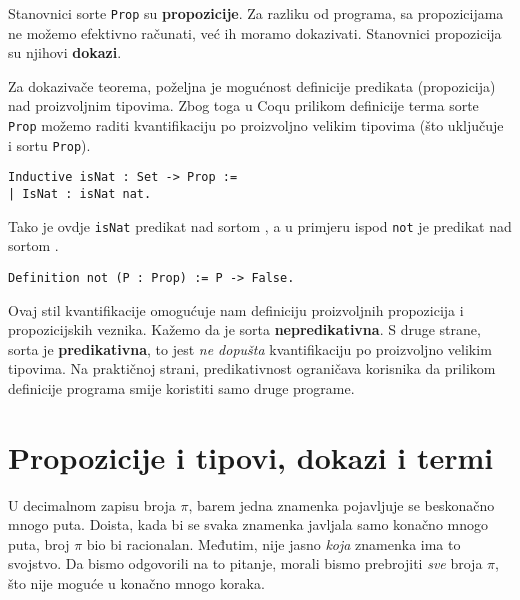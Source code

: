 Stanovnici sorte \texttt{Prop} su \textbf{propozicije}.
Za razliku od programa, sa propozicijama ne možemo efektivno računati, već ih moramo dokazivati.
Stanovnici propozicija su njihovi \textbf{dokazi}.

Za dokazivače teorema, poželjna je mogućnost definicije predikata (propozicija) nad proizvoljnim tipovima.
Zbog toga u Coqu prilikom definicije terma sorte \texttt{Prop} možemo raditi kvantifikaciju po proizvoljno velikim tipovima
(što uključuje i sortu \texttt{Prop}).
\begin{verbatim}
Inductive isNat : Set -> Prop :=
| IsNat : isNat nat.
\end{verbatim}
\noindent Tako je ovdje \texttt{isNat} predikat nad sortom \coqset{}, a u primjeru ispod \texttt{not} je predikat nad sortom \coqprop{}.
\begin{verbatim}
Definition not (P : Prop) := P -> False.
\end{verbatim}
\noindent Ovaj stil kvantifikacije omogućuje nam definiciju proizvoljnih propozicija i propozicijskih veznika.
Kažemo da je sorta \coqprop{} \textbf{nepredikativna}.
S druge strane, sorta \coqset{} je \textbf{predikativna}, to jest \textit{ne dopušta} kvantifikaciju po proizvoljno velikim tipovima.
Na praktičnoj strani, predikativnost ograničava korisnika da prilikom definicije programa smije koristiti samo druge programe.


\section{Propozicije i tipovi, dokazi i termi}\label{sec:propozicije-i-tipovi}
U decimalnom zapisu broja \(\pi\), barem jedna znamenka pojavljuje se beskonačno mnogo puta.
Doista, kada bi se svaka znamenka javljala samo konačno mnogo puta, broj \(\pi\) bio bi racionalan.
Međutim, nije jasno \textit{koja} znamenka ima to svojstvo.
Da bismo odgovorili na to pitanje, morali bismo prebrojiti \textit{sve} broja \(\pi\),
što nije moguće u konačno mnogo koraka.

